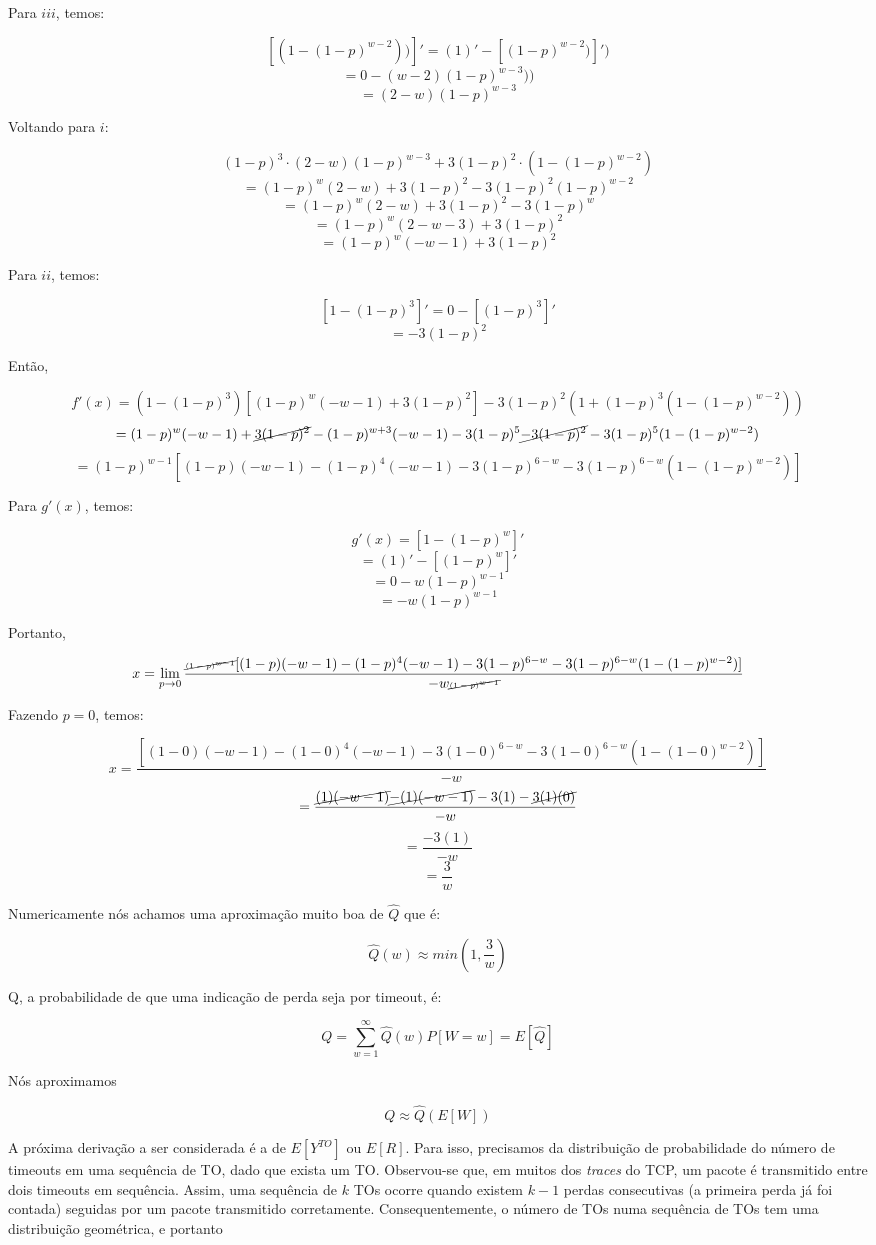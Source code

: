 Para $iii$, temos:

$$[(1 - (1-p)^{w-2}))]' = (1)' - [(1-p)^{w-2})]') $$
$$ = 0 - (w-2)(1-p)^{w-3})) $$
$$ = (2-w)(1-p)^{w-3} $$

Voltando para $i$:

$$ (1-p)^3\cdot (2-w)(1-p)^{w-3} + 3(1-p)^2\cdot (1 - (1-p)^{w-2})$$
$$= (1-p)^w(2-w) + 3(1-p)^2 - 3(1-p)^2(1-p)^{w-2}$$
$$= (1-p)^w(2-w) + 3(1-p)^2 - 3(1-p)^w$$
$$= (1-p)^w(2-w -3) + 3(1-p)^2$$
$$= (1-p)^w(-w -1) + 3(1-p)^2$$

Para $ii$, temos:

$$[1-(1-p)^3]' = 0 - [(1-p)^3]' $$
$$= - 3(1-p)^2 $$

Então, 

$$f'(x) = (1 - (1-p)^3)[(1-p)^w(-w-1) + 3(1-p)^2] - 3(1-p)^2(1+(1-p)^3(1-(1-p)^{w-2})) $$
$$= (1-p)^w(-w-1) + \cancel{3(1-p)^2} - (1-p)^{w+3}(-w-1) - 3(1-p)^5 \cancel{- 3(1-p)^2} - 3(1-p)^5(1-(1-p)^{w-2}) $$
$$= (1-p)^{w-1}[(1-p)(-w-1) - (1-p)^4(-w-1) - 3(1-p)^{6-w} - 3(1-p)^{6-w}(1-(1-p)^{w-2})]$$

Para $g'(x)$, temos:

$$g'(x) = [1 - (1-p)^w]' $$
$$ = (1)' - [(1-p)^w]' $$
$$ = 0 - w(1-p)^{w-1} $$
$$ = - w(1-p)^{w-1} $$

Portanto, 

$$\tiny{x = \lim_{p \to 0}\frac{\cancel{(1-p)^{w-1}}[(1-p)(-w-1) - (1-p)^4(-w-1) - 3(1-p)^{6-w} - 3(1-p)^{6-w}(1-(1-p)^{w-2})]}{- w\cancel{(1-p)^{w-1}}} }$$

Fazendo $p = 0$, temos:

$$x = \frac{[(1-0)(-w-1) - (1-0)^4(-w-1) - 3(1-0)^{6-w} - 3(1-0)^{6-w}(1-(1-0)^{w-2})]}{- w} $$
$$= \frac{\cancel{(1)(-w-1)} \cancel{- (1)(-w-1)} - 3(1) - \cancel{3(1)(0)}}{- w} $$
$$= \frac{- 3(1)}{- w} $$
$$= \frac{3}{w} $$

Numericamente nós achamos uma aproximação muito boa de $\hat{Q}$ que é:

$$\hat{Q}(w) \approx min(1, \frac{3}{w}) $$

Q, a probabilidade de que uma indicação de perda seja por timeout, é:

$$Q = \sum_{w=1}^{\infty}\hat{Q}(w)P[W = w] = E[\hat{Q}]$$

Nós aproximamos 

$$Q \approx \hat{Q}(E[W])$$

A próxima derivação a ser considerada é a de $E[Y^{TO}]$ ou $E[R]$. Para isso, precisamos da distribuição de probabilidade do número de timeouts em uma sequência de TO, dado que exista um TO. Observou-se que, em muitos dos \textit{traces} do TCP, um pacote é transmitido entre dois timeouts em sequência. Assim, uma sequência de $k$ TOs ocorre quando existem $k - 1$ perdas consecutivas (a primeira perda já foi contada) seguidas por um pacote transmitido corretamente. Consequentemente, o número de TOs numa sequência de TOs tem uma distribuição geométrica, e portanto


